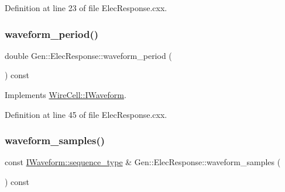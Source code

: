 Definition at line 23 of file Elec\+Response.\+cxx.

\mbox{\label{class_wire_cell_1_1_gen_1_1_elec_response_a7e2061fe4702e667aecb29427383a5ce}} 
\subsubsection{\texorpdfstring{waveform\+\_\+period()}{waveform\_period()}}
{\footnotesize\ttfamily double Gen\+::\+Elec\+Response\+::waveform\+\_\+period (\begin{DoxyParamCaption}{ }\end{DoxyParamCaption}) const\hspace{0.3cm}{\ttfamily [virtual]}}



Implements \hyperlink{class_wire_cell_1_1_i_waveform_a0d5d0cd99b8a4e49d5d8b633150b707a}{Wire\+Cell\+::\+I\+Waveform}.



Definition at line 45 of file Elec\+Response.\+cxx.

\mbox{\label{class_wire_cell_1_1_gen_1_1_elec_response_a78f88dda994c96afaf9b7d82044a46a7}} 
\subsubsection{\texorpdfstring{waveform\+\_\+samples()}{waveform\_samples()}}
{\footnotesize\ttfamily const \hyperlink{class_wire_cell_1_1_i_waveform_ad8f85e800ab8082ddbd89ac91164db7d}{I\+Waveform\+::sequence\+\_\+type} \& Gen\+::\+Elec\+Response\+::waveform\+\_\+samples (\begin{DoxyParamCaption}{ }\end{DoxyParamCaption}) const\hspace{0.3cm}{\ttfamily [virtual]}}



